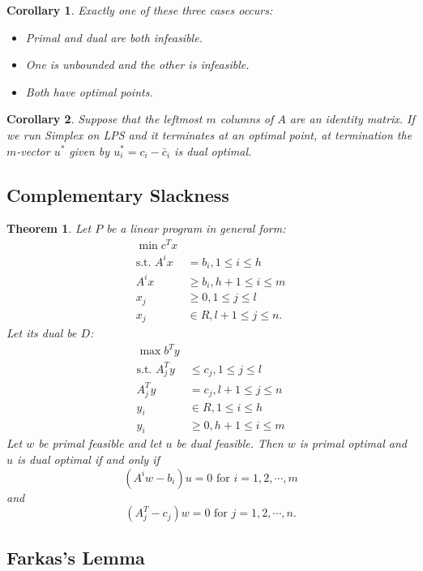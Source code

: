 \documentclass[11pt]{article} %
\theoremstyle{plain}%
\newtheorem{thm}{Theorem}[section]
\newtheorem*{cor}{Corollary}
\theoremstyle{definition}
\theoremstyle{remark}
\begin{document}
\begin{cor}
Exactly one of these three cases occurs: 
\begin{itemize}
\item Primal and dual are both infeasible. 
\item One is unbounded and the other is infeasible. 
\item Both have optimal points. 
\end{itemize}
\end{cor}

\begin{cor}
Suppose that the leftmost $m$ columns of $A$ are an identity matrix. If we run Simplex
on LPS and it terminates at an optimal point, at termination the $m$-vector $u^*$ given 
by $u^*_i = c_i - \bar{c}_i$ is dual optimal. 
\end{cor}

\subsection{Complementary Slackness}

\begin{thm}
Let $P$ be a linear program in general form:
\begin{align*}
\min c^T x \\
\text{s.t. } A^i x &= b_i, 1 \leq i \leq h \\
A^i  x &\geq b_i, h+1 \leq i \leq m \\
x_j &\geq 0, 1 \leq j \leq l \\
x_j &\in R, l+1 \leq j \leq n. 
\end{align*}
Let its dual be $D$: 
\begin{align*}
\max b^T y \\
\text{s.t. } A_j^T y &\leq c_j, 1 \leq j \leq l \\
A_j^T y &= c_j, l+1 \leq j \leq n \\
y_i &\in R, 1 \leq i \leq h \\
y_i &\geq 0, h+1 \leq i \leq m
\end{align*}
Let $w$ be primal feasible and let $u$ be dual feasible. Then $w$ is primal optimal 
and $u$ is dual optimal if and only if 
$$ (A^i w - b_i) u = 0 \text{ for } i = 1, 2, \cdots, m$$
and 
$$ (A_j^T - c_j) w = 0 \text{ for } j = 1, 2, \cdots, n. $$
\end{thm}

\subsection{Farkas's Lemma}
\end{document}
